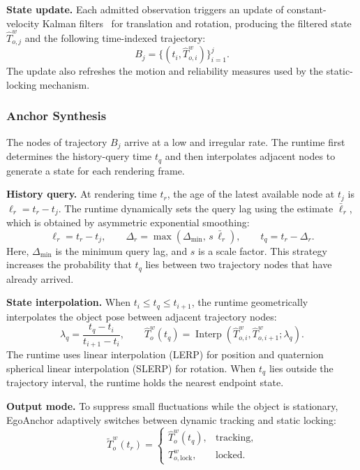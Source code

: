 \documentclass[review]{vgtc}
\begin{document}
\textbf{State update.}
Each admitted observation triggers an update of constant-velocity Kalman filters~\cite{kalman1960new} for translation and rotation, producing the filtered state $\widehat{T}_{o,j}^{w}$ and the following time-indexed trajectory:
\begin{equation}
B_j = \{(t_i, \widehat{T}_{o,i}^{w})\}_{i=1}^{j}.
\label{eq:trajectory}
\end{equation}
The update also refreshes the motion and reliability measures used by the static-locking mechanism.

\subsubsection{Anchor Synthesis}\label{sec:frame-output}

The nodes of trajectory $B_j$ arrive at a low and irregular rate. The runtime first determines the history-query time $t_q$ and then interpolates adjacent nodes to generate a state for each rendering frame.

\textbf{History query.}
At rendering time $t_r$, the age of the latest available node at $t_j$ is $\ell_r=t_r-t_j$. The runtime dynamically sets the query lag using the estimate $\bar{\ell}_r$, which is obtained by asymmetric exponential smoothing:
\begin{equation}
\ell_r = t_r - t_j, \qquad \Delta_r = \max(\Delta_{\min},\, s\,\bar{\ell}_r), \qquad t_q = t_r - \Delta_r.
\label{eq:target-time}
\end{equation}
Here, $\Delta_{\min}$ is the minimum query lag, and $s$ is a scale factor. This strategy increases the probability that $t_q$ lies between two trajectory nodes that have already arrived.

\textbf{State interpolation.}
When $t_i\leq t_q\leq t_{i+1}$, the runtime geometrically interpolates the object pose between adjacent trajectory nodes:
\begin{equation}
\lambda_q = \frac{t_q - t_i}{t_{i+1} - t_i}, \qquad
\widehat{T}_o^w(t_q) = \operatorname{Interp}(\widehat{T}_{o,i}^{w}, \widehat{T}_{o,i+1}^{w}; \lambda_q).
\label{eq:history-interp}
\end{equation}
The runtime uses linear interpolation (LERP) for position and quaternion spherical linear interpolation (SLERP) for rotation. When $t_q$ lies outside the trajectory interval, the runtime holds the nearest endpoint state.

\textbf{Output mode.}
To suppress small fluctuations while the object is stationary, EgoAnchor adaptively switches between dynamic tracking and static locking:
\begin{equation}
\widetilde{T}_o^w(t_r) = \begin{cases}
\widehat{T}_o^w(t_q), & \text{tracking}, \\
T_{o,\mathrm{lock}}^w, & \text{locked}.
\end{cases}
\label{eq:staticlock}
\end{equation}
\end{document}
